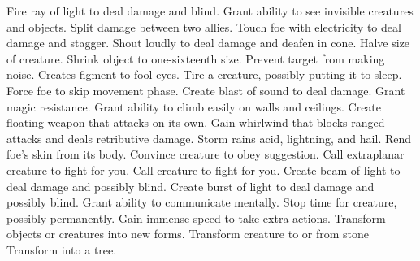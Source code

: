     {Fire ray of light to deal damage and blind.}
    {Grant ability to see invisible creatures and objects.}
    {Split damage between two allies.}
    {Touch foe with electricity to deal damage and stagger.}
    {Shout loudly to deal damage and deafen in cone.}
    {Halve size of creature.}
    {Shrink object to one-sixteenth size.}
    {Prevent target from making noise.}
    {Creates figment to fool eyes.}
    {Tire a creature, possibly putting it to sleep.}
    {Force foe to skip movement phase.}
    {Create blast of sound to deal damage.}
    {Grant magic resistance.}
    {Grant ability to climb easily on walls and ceilings.}
    {Create floating weapon that attacks on its own.}
    {Gain whirlwind that blocks ranged attacks and deals retributive damage.}
    {Storm rains acid, lightning, and hail.}
    {Rend foe's skin from its body.}
    {Convince creature to obey suggestion.}
    {Call extraplanar creature to fight for you.}
    {Call creature to fight for you.}
    {Create beam of light to deal damage and possibly blind.}
    {Create burst of light to deal damage and possibly blind.}
    {Grant ability to communicate mentally.}
    {Stop time for creature, possibly permanently.}
    {Gain immense speed to take extra actions.}
    {Transform objects or creatures into new forms.}
    {Transform creature to or from stone}
    {Transform into a tree.}
